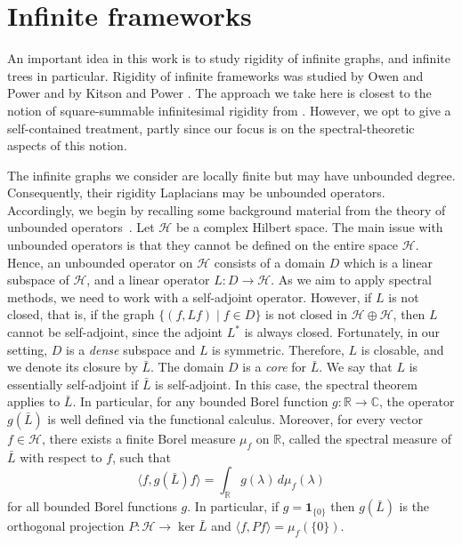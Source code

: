 \documentclass[10pt,a4paper]{amsart}
\numberwithin{equation}{section}
\newcommand{\R}{\mathbb R}
\newcommand{\C}{\mathbb C}
\newcommand{\cH}{\mathcal H}
\begin{document}
\section{Infinite frameworks}\label{sec:inf_fram}
An important idea in this work is to study rigidity of infinite graphs, and
infinite trees in particular. Rigidity of infinite frameworks was studied by
Owen and Power \cite{OwenPowerInfiniteFrameworksOperatorTheory} and by
Kitson and Power \cite{KitsonPowerRigidityInfiniteGraphs}. The approach we
take here is closest to the notion of square-summable
infinitesimal rigidity from \cite{OwenPowerInfiniteFrameworksOperatorTheory}.
However, we opt to give a self-contained treatment, partly since our focus is on the spectral-theoretic aspects of this notion.

The infinite graphs we consider are locally finite but may have unbounded degree. Consequently, their rigidity Laplacians may be unbounded operators. Accordingly, we begin by recalling some background material from the theory of unbounded operators~\cite{ReedSimonI}.
Let $\cH$ be a complex Hilbert space. The main issue with unbounded operators is that they cannot be defined on the entire space $\cH$. Hence, an unbounded operator on $\cH$ consists of a domain $D$ which is a linear subspace of $\cH$, and a linear operator $L:D\to \cH$. As we aim to apply spectral methods, we need to work with a self-adjoint operator. However, if $L$ is not closed, that is, if the graph $\{(f,Lf)\mid f\in D\}$ is not closed in $\cH\oplus\cH$, then $L$ cannot be self-adjoint, since the adjoint $L^*$ is always closed. 
Fortunately, in our setting, $D$ is a {\em dense} subspace and $L$ is symmetric. Therefore, $L$ is closable, and we denote its closure by $\bar L$. The domain $D$ is a {\em core} for $\bar L$.
We say that $L$ is essentially self-adjoint if $\bar L$ is self-adjoint.
In this case, the spectral theorem applies to $\bar L$. In particular, for any bounded Borel function $g:\R\to\C$, the operator $g(\bar L)$ is well defined via the functional calculus. Moreover, for every vector $f\in\cH$, there exists a finite Borel measure $\mu_f$ on $\R$, called the spectral measure of $\bar L$ with respect to $f$, such that
\[
\langle f, g(\bar L) f\rangle = \int_\R g(\lambda)\, d\mu_f(\lambda)
\]
for all bounded Borel functions $g$. In particular, if $g=\mathbf 1_{\{0\}}$ then $g(\bar L)$ is the orthogonal projection $P:\cH\to\ker\bar L$ and $\langle f,Pf\rangle=\mu_f(\{0\})$.
\end{document}
